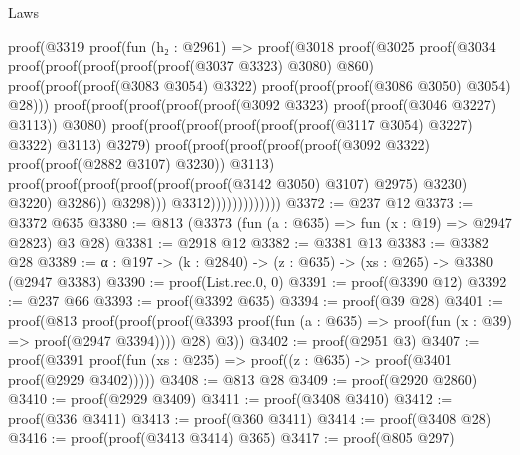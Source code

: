 \begin{lexlean}{Laws}
\begin{coremodule}
              proof(@3319
                  proof(fun (h₂ : @2961) =>
                    proof(@3018
                        proof(@3025
                            proof(@3034
                                proof(proof(proof(proof(proof(@3037 @3323) @3080) @860)
                                      proof(proof(proof(@3083 @3054) @3322)
                                          proof(proof(proof(@3086 @3050) @3054) @28)))
                                    proof(proof(proof(proof(proof(@3092 @3323)
                                              proof(proof(@3046 @3227) @3113))
                                            @3080)
                                          proof(proof(proof(proof(proof(proof(@3117 @3054) @3227)
                                                    @3322)
                                                  @3113)
                                                @3279)
                                              proof(proof(proof(proof(proof(@3092 @3322)
                                                        proof(proof(@2882 @3107) @3230))
                                                      @3113)
                                                    proof(proof(proof(proof(proof(proof(@3142 @3050)
                                                                @3107)
                                                              @2975)
                                                            @3230)
                                                          @3220)
                                                        @3286))
                                                  @3298)))
                                        @3312)))))))))))))
@3372 := @237 @12
@3373 := @3372 @635
@3380 := @813 (@3373 (fun (a : @635) => fun (x : @19) => @2947 @2823) @3 @28)
@3381 := @2918 @12
@3382 := @3381 @13
@3383 := @3382 @28
@3389 := {α : @197} -> (k : @2840) -> (z : @635) -> (xs : @265) -> @3380 (@2947 @3383)
@3390 := proof(List.rec.{0, 0})
@3391 := proof(@3390 @12)
@3392 := @237 @66
@3393 := proof(@3392 @635)
@3394 := proof(@39 @28)
@3401 := proof(@813
      proof(proof(proof(@3393 proof(fun (a : @635) => proof(fun (x : @39) => proof(@2947 @3394))))
            @28)
          @3))
@3402 := proof(@2951 @3)
@3407 := proof(@3391 proof(fun (xs : @235) => proof((z : @635) -> proof(@3401 proof(@2929 @3402)))))
@3408 := @813 @28
@3409 := proof(@2920 @2860)
@3410 := proof(@2929 @3409)
@3411 := proof(@3408 @3410)
@3412 := proof(@336 @3411)
@3413 := proof(@360 @3411)
@3414 := proof(@3408 @28)
@3416 := proof(proof(@3413 @3414) @365)
@3417 := proof(@805 @297)

\end{coremodule}
\end{lexlean}
